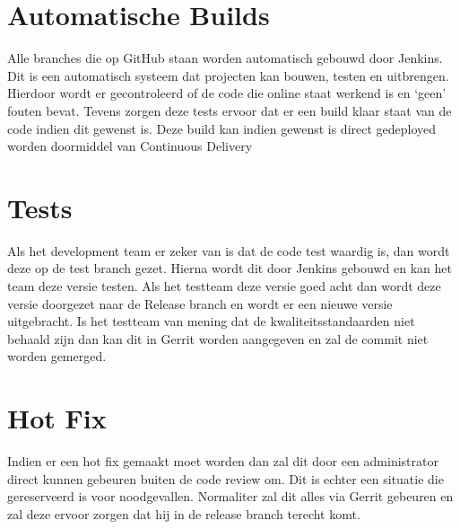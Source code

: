 \documentclass{scrreprt}
\begin{document}
	\chapter{Automatische Builds}
	Alle branches die op GitHub staan worden automatisch gebouwd door Jenkins. Dit is een automatisch systeem dat projecten kan bouwen, testen en uitbrengen. Hierdoor wordt er gecontroleerd of de code die online staat werkend is en ‘geen’ fouten bevat. Tevens zorgen deze tests ervoor dat er een build klaar staat van de code indien dit gewenst is. Deze build kan indien gewenst is direct gedeployed worden doormiddel van Continuous Delivery
	\chapter{Tests}
	Als het development team er zeker van is dat de code test waardig is, dan wordt deze op de test branch gezet. Hierna wordt dit door Jenkins gebouwd en kan het team deze versie testen. Als het testteam deze versie goed acht dan wordt deze versie doorgezet naar de Release branch en wordt er een nieuwe versie uitgebracht. Is het testteam van mening dat de kwaliteitsstandaarden niet behaald zijn dan kan dit in Gerrit worden aangegeven en zal de commit niet worden gemerged.
	\chapter{Hot Fix}
	Indien er een hot fix gemaakt moet worden dan zal dit door een administrator direct kunnen gebeuren buiten de code review om. Dit is echter een situatie die gereserveerd is voor noodgevallen. Normaliter zal dit alles via Gerrit gebeuren en zal deze ervoor zorgen dat hij in de release branch terecht komt.
\end{document}
